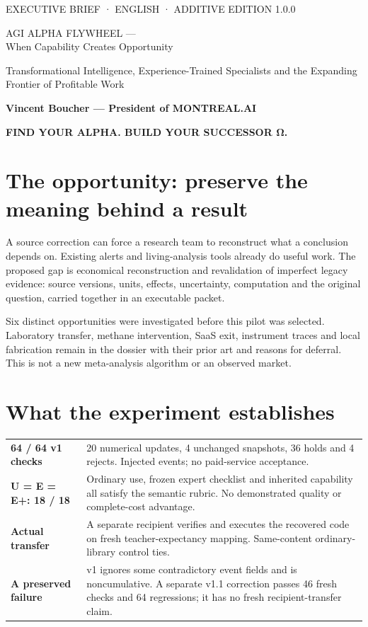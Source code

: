 \documentclass[10pt]{article}
\begin{document}
\fontsize{9.5}{11.2}\selectfont
\thispagestyle{empty}
{\sffamily\small\color{teal}EXECUTIVE BRIEF · ENGLISH · ADDITIVE EDITION 1.0.0\par}
\vspace{4mm}

{\sffamily\bfseries\color{navy}\fontsize{20}{24}\selectfont\raggedright AGI ALPHA FLYWHEEL —\\When Capability Creates Opportunity\par}
\vspace{3mm}
{\sffamily\fontsize{11}{13}\selectfont Transformational Intelligence, Experience-Trained Specialists and the Expanding Frontier of Profitable Work\par}
\vspace{3mm}
\textbf{Vincent Boucher — President of MONTREAL.AI}

{\sffamily\bfseries\color{teal}FIND YOUR ALPHA. BUILD YOUR SUCCESSOR Ω.}

\section*{The opportunity: preserve the meaning behind a result}

A source correction can force a research team to reconstruct what a conclusion depends on. Existing alerts and living-analysis tools already do useful work. The proposed gap is economical reconstruction and revalidation of imperfect legacy evidence: source versions, units, effects, uncertainty, computation and the original question, carried together in an executable packet.

Six distinct opportunities were investigated before this pilot was selected. Laboratory transfer, methane intervention, SaaS exit, instrument traces and local fabrication remain in the dossier with their prior art and reasons for deferral. This is not a new meta-analysis algorithm or an observed market.

\section*{What the experiment establishes}

\begin{tabularx}{\textwidth}{p{}Y}
\toprule
\textbf{64 / 64 v1 checks} &20 numerical updates, 4 unchanged snapshots, 36 holds and 4 rejects. Injected events; no paid-service acceptance.\\
\textbf{U = E = E+: 18 / 18} &Ordinary use, frozen expert checklist and inherited capability all satisfy the semantic rubric. No demonstrated quality or complete-cost advantage.\\
\textbf{Actual transfer} &A separate recipient verifies and executes the recovered code on fresh teacher-expectancy mapping. Same-content ordinary-library control ties.\\
\textbf{A preserved failure} &v1 ignores some contradictory event fields and is noncumulative. A separate v1.1 correction passes 46 fresh checks and 64 regressions; it has no fresh recipient-transfer claim.\\
\bottomrule
\end{tabularx}
\end{document}
